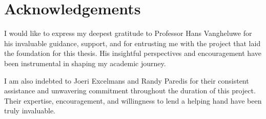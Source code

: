 \clearpage 
{} 
{}
\chapter*{Acknowledgements}
I would like to express my deepest gratitude to Professor Hans Vangheluwe for his invaluable guidance, support, and for entrusting me with the project that laid the foundation for this thesis. His insightful perspectives and encouragement have been instrumental in 
shaping my academic journey.

I am also indebted to Joeri Excelmans and Randy Paredis for their consistent assistance and unwavering commitment throughout the duration of this project. Their expertise, encouragement, and willingness to lend a helping hand have been truly invaluable.
